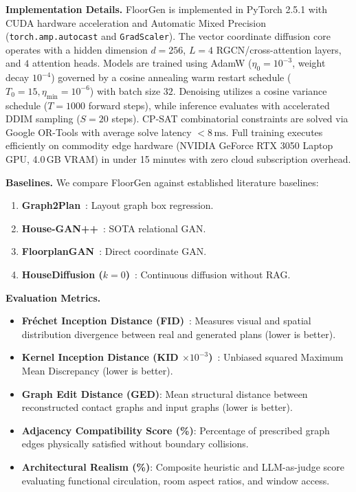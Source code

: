 \documentclass[journal]{IEEEtran}
\begin{document}
\noindent\textbf{Implementation Details.} FloorGen is implemented in PyTorch 2.5.1 with CUDA hardware acceleration and Automatic Mixed Precision (\texttt{torch.amp.autocast} and \texttt{GradScaler}). The vector coordinate diffusion core operates with a hidden dimension $d=256$, $L=4$ RGCN/cross-attention layers, and $4$ attention heads. Models are trained using AdamW ($\eta_0 = 10^{-3}$, weight decay $10^{-4}$) governed by a cosine annealing warm restart schedule ($T_0 = 15, \eta_{\min} = 10^{-6}$) with batch size $32$. Denoising utilizes a cosine variance schedule ($T=1000$ forward steps), while inference evaluates with accelerated DDIM sampling ($S=20$ steps). CP-SAT combinatorial constraints are solved via Google OR-Tools with average solve latency $< 8\,\mathrm{ms}$. Full training executes efficiently on commodity edge hardware (NVIDIA GeForce RTX 3050 Laptop GPU, 4.0\,GB VRAM) in under 15 minutes with zero cloud subscription overhead.

\noindent\textbf{Baselines.} We compare FloorGen against established literature baselines:
\begin{enumerate}
    \item \textbf{Graph2Plan}~\cite{hu2020graph2plan}: Layout graph box regression.
    \item \textbf{House-GAN++}~\cite{nauata2021house}: SOTA relational GAN.
    \item \textbf{FloorplanGAN}~\cite{luo2022floorplangan}: Direct coordinate GAN.
    \item \textbf{HouseDiffusion ($k=0$)}~\cite{shabani2023housediffusion}: Continuous diffusion without RAG.
\end{enumerate}

\noindent\textbf{Evaluation Metrics.}
\begin{itemize}
    \item \textbf{Fréchet Inception Distance (FID)}~\cite{heusel2017gans}: Measures visual and spatial distribution divergence between real and generated plans (lower is better).
    \item \textbf{Kernel Inception Distance (KID $\times 10^{-3}$)}~\cite{binkowski2018demystifying}: Unbiased squared Maximum Mean Discrepancy (lower is better).
    \item \textbf{Graph Edit Distance (GED)}: Mean structural distance between reconstructed contact graphs and input graphs (lower is better).
    \item \textbf{Adjacency Compatibility Score (\%)}: Percentage of prescribed graph edges physically satisfied without boundary collisions.
    \item \textbf{Architectural Realism (\%)}: Composite heuristic and LLM-as-judge score evaluating functional circulation, room aspect ratios, and window access.
\end{itemize}
\end{document}
